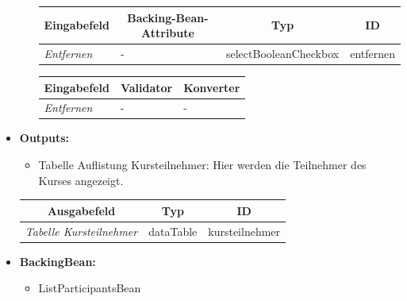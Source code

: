 \begin{itemize}
\begin{itemize}
				\begin{center}
					\begin{longtable}{|p{3cm} |p{5cm} | p{4cm}|p{3cm}|}
						
						\hline \multicolumn{1}{|c|}{\textbf{Eingabefeld}} & \multicolumn{1}{|c|}{\textbf{Backing-Bean-Attribute}} & \multicolumn{1}{|c|}{\textbf{Typ}}  &  \multicolumn{1}{|c|}{\textbf{ID}} \\ \hline
						\endfirsthead
						\hline
						\endlastfoot
						\textit{Entfernen} & - & selectBooleanCheckbox & entfernen \\ \hline
					\end{longtable}
				\end{center}
				
				\begin{center}
					\begin{longtable}{|p{3cm} |p{8cm} | p{5cm}|}
						
						\hline \multicolumn{1}{|c|}{\textbf{Eingabefeld}} & \multicolumn{1}{|c|}{\textbf{Validator}} & \multicolumn{1}{|c|}{\textbf{Konverter}} \\ \hline
						\endfirsthead
						\hline
						\endlastfoot
						\textit{Entfernen} & - & - \\ \hline
					\end{longtable}
				\end{center}
				
			\end{itemize}
			\item \textbf{Outputs:} 
			\begin{itemize}
				\item Tabelle Auflistung Kursteilnehmer: Hier werden die Teilnehmer des Kurses angezeigt.
			\end{itemize}
			
			\begin{center}
				\begin{longtable}{|p{5cm} | p{4cm}|p{3cm}|}
					
					\hline \multicolumn{1}{|c|}{\textbf{Ausgabefeld}} & \multicolumn{1}{|c|}{\textbf{Typ}}  &  \multicolumn{1}{|c|}{\textbf{ID}} \\ \hline
					\endfirsthead
					\hline
					\endlastfoot
					\textit{Tabelle Kursteilnehmer}  & dataTable & kursteilnehmer \\ \hline
				\end{longtable}
			\end{center}
			
			
			\item \textbf{BackingBean:}
			\begin{itemize}
				\item ListParticipantsBean
			\end{itemize}
		\end{itemize}
		
